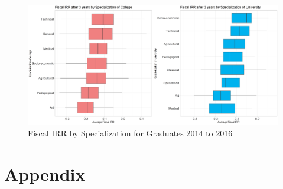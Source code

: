 \documentclass[alpha-refs]{wiley-article-05g}
\begin{document}
\begin{center}
	\begin{figure}[htbp!]
\begin{minipage}[b]{1\linewidth}
			\centering
			\includegraphics[width=6in]{returns_by_areas.png}
		\end{minipage}
			\caption{Fiscal IRR by Specialization for Graduates 2014 to 
			2016}\label{fig:1.18}
	\end{figure}
\end{center}


\newpage

\printbibliography

\newpage
\section*{Appendix}
%

\setcounter{table}{0}
\renewcommand{\thetable}{A\arabic{table}}

\setcounter{figure}{0}
\renewcommand{\thefigure}{A\arabic{figure}}
\end{document}

